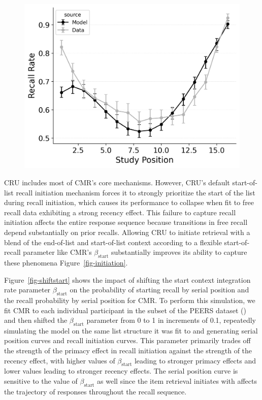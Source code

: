 \documentclass[
  man,
  floatsintext,
  longtable,
  nolmodern,
  notxfonts,
  notimes,
  draftfirst,
  colorlinks=true,linkcolor=blue,citecolor=blue,urlcolor=blue]{apa7}
\begin{document}
\begin{figure}
\begin{minipage}{0.33\linewidth}
\includegraphics{figures/bw_HealeyKahana2014_CRU_with_Primacy_and_StartDrift_Fitting_spc.png}\end{minipage}%

\end{figure}%

CRU includes most of CMR's core mechanisms. However, CRU's default
start-of-list recall initiation mechanism forces it to strongly
prioritize the start of the list during recall initiation, which causes
its performance to collapse when fit to free recall data exhibiting a
strong recency effect. This failure to capture recall initiation affects
the entire response sequence because transitions in free recall depend
substantially on prior recalls. Allowing CRU to initiate retrieval with
a blend of the end-of-list and start-of-list context according to a
flexible start-of-recall parameter like CMR's \(\beta_\text{start}\)
substantially improves its ability to capture these phenomena
Figure~\ref{fig-initiation}.

Figure~\ref{fig-shiftstart} shows the impact of shifting the start
context integration rate parameter \(\beta_\text{start}\) on the
probability of starting recall by serial position and the recall
probability by serial position for CMR. To perform this simulation, we
fit CMR to each individual participant in the subset of the PEERS
dataset () and
then shifted the \(\beta_\text{start}\) parameter from 0 to 1 in
increments of 0.1, repeatedly simulating the model on the same list
structure it was fit to and generating serial position curves and recall
initiation curves. This parameter primarily trades off the strength of
the primacy effect in recall initiation against the strength of the
recency effect, with higher values of \(\beta_\text{start}\) leading to
stronger primacy effects and lower values leading to stronger recency
effects. The serial position curve is sensitive to the value of
\(\beta_\text{start}\) as well since the item retrieval initiates with
affects the trajectory of responses throughout the recall sequence.
\end{document}

